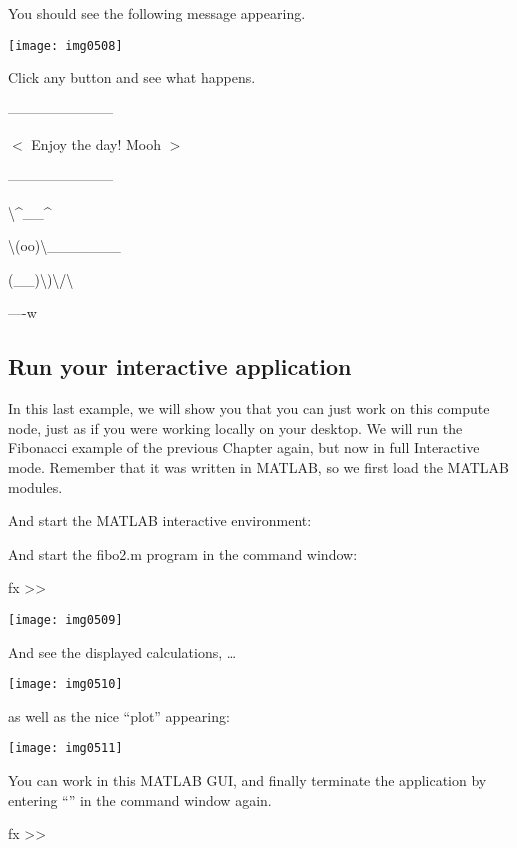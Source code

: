 You should see the following message appearing.

\texttt{[image: img0508]}

Click any button and see what happens.

\ifantwerpen
\begin{prompt}
  -----------------------

  $<$ Enjoy the day! Mooh $>$

  -----------------------

           \textbackslash    \^{}\_\_\^{}

           \textbackslash   (oo)\textbackslash \_\_\_\_\_\_\_

              (\_\_)\textbackslash        )\textbackslash /\textbackslash

                   \textbar \textbar ----w \textbar

                   \textbar \textbar      \textbar \textbar

\end{prompt}
\fi

\subsection{Run your interactive application}

In this last example, we will show you that you can just work on this compute
node, just as if you were working locally on your desktop.  We will run the
Fibonacci example of the previous Chapter again, but now in full Interactive
mode. Remember that it was written in MATLAB, so we first load the MATLAB
modules.

\begin{prompt}
\end{prompt}

And start the MATLAB interactive environment:

\begin{prompt}
\end{prompt}

And start the fibo2.m program in the command window:
\begin{prompt}
fx >> %
\end{prompt}

\texttt{[image: img0509]}

And see the displayed calculations, \dots

\texttt{[image: img0510]}

as well as the nice ``plot'' appearing:

\texttt{[image: img0511]}

You can work in this MATLAB GUI, and finally terminate the application by
entering ``'' in the command window again.

\begin{prompt}
fx >> %
\end{prompt}
